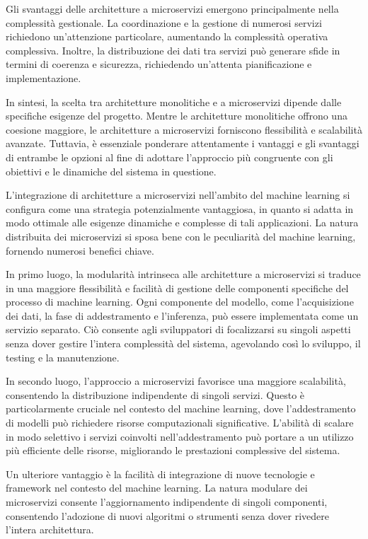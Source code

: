 Gli svantaggi delle architetture a microservizi emergono principalmente nella complessità gestionale. La coordinazione e la gestione di numerosi servizi richiedono un'attenzione particolare, aumentando la complessità operativa complessiva. Inoltre, la distribuzione dei dati tra servizi può generare sfide in termini di coerenza e sicurezza, richiedendo un'attenta pianificazione e implementazione.

In sintesi, la scelta tra architetture monolitiche e a microservizi dipende dalle specifiche esigenze del progetto. Mentre le architetture monolitiche offrono una coesione maggiore, le architetture a microservizi forniscono flessibilità e scalabilità avanzate. Tuttavia, è essenziale ponderare attentamente i vantaggi e gli svantaggi di entrambe le opzioni al fine di adottare l'approccio più congruente con gli obiettivi e le dinamiche del sistema in questione.

L'integrazione di architetture a microservizi nell'ambito del machine learning si configura come una strategia potenzialmente vantaggiosa, in quanto si adatta in modo ottimale alle esigenze dinamiche e complesse di tali applicazioni. La natura distribuita dei microservizi si sposa bene con le peculiarità del machine learning, fornendo numerosi benefici chiave.

In primo luogo, la modularità intrinseca alle architetture a microservizi si traduce in una maggiore flessibilità e facilità di gestione delle componenti specifiche del processo di machine learning. Ogni componente del modello, come l'acquisizione dei dati, la fase di addestramento e l'inferenza, può essere implementata come un servizio separato. Ciò consente agli sviluppatori di focalizzarsi su singoli aspetti senza dover gestire l'intera complessità del sistema, agevolando così lo sviluppo, il testing e la manutenzione.

In secondo luogo, l'approccio a microservizi favorisce una maggiore scalabilità, consentendo la distribuzione indipendente di singoli servizi. Questo è particolarmente cruciale nel contesto del machine learning, dove l'addestramento di modelli può richiedere risorse computazionali significative. L'abilità di scalare in modo selettivo i servizi coinvolti nell'addestramento può portare a un utilizzo più efficiente delle risorse, migliorando le prestazioni complessive del sistema.

Un ulteriore vantaggio è la facilità di integrazione di nuove tecnologie e framework nel contesto del machine learning. La natura modulare dei microservizi consente l'aggiornamento indipendente di singoli componenti, consentendo l'adozione di nuovi algoritmi o strumenti senza dover rivedere l'intera architettura.

